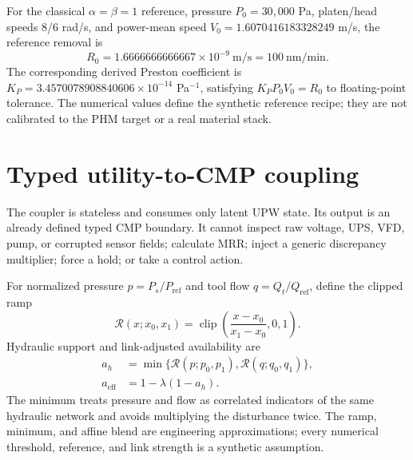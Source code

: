 \documentclass[10pt,twocolumn]{article}
\begin{document}
For the classical $\alpha=\beta=1$ reference, pressure $P_0=30{,}000$ Pa,
platen/head speeds 8/6 rad/s, and power-mean speed
$V_0=1.6070416183328249$ m/s, the reference removal is
\begin{equation}
 R_0=1.6666666666667\times10^{-9}\ \mathrm{m/s}
 =100\ \mathrm{nm/min}.
\end{equation}
The corresponding derived Preston coefficient is
$K_P=3.4570078908840606\times10^{-14}$ Pa$^{-1}$, satisfying
$K_PP_0V_0=R_0$ to floating-point tolerance. The numerical values define the
synthetic reference recipe; they are not calibrated to the PHM target or a
real material stack.

\section{Typed utility-to-CMP coupling}

The coupler is stateless and consumes only latent UPW state. Its output is an
already defined typed CMP boundary. It cannot inspect raw voltage, UPS, VFD,
pump, or corrupted sensor fields; calculate MRR; inject a generic discrepancy
multiplier; force a hold; or take a control action.

For normalized pressure $p=P_s/P_{\mathrm{ref}}$ and tool flow
$q=Q_t/Q_{\mathrm{ref}}$, define the clipped ramp
\begin{equation}
 \mathcal R(x;x_0,x_1)=\operatorname{clip}
 \left(\frac{x-x_0}{x_1-x_0},0,1\right).
 \label{eq:ramp}
\end{equation}
Hydraulic support and link-adjusted availability are
\begin{equation}
\begin{aligned}
 a_h&=\min\{\mathcal R(p;p_0,p_1),
                 \mathcal R(q;q_0,q_1)\},\\
 a_{\mathrm{eff}}&=1-\lambda(1-a_h).
\end{aligned}
 \label{eq:availability}
\end{equation}
The minimum treats pressure and flow as correlated indicators of the same
hydraulic network and avoids multiplying the disturbance twice. The ramp,
minimum, and affine blend are engineering approximations; every numerical
threshold, reference, and link strength is a synthetic assumption.
\end{document}
